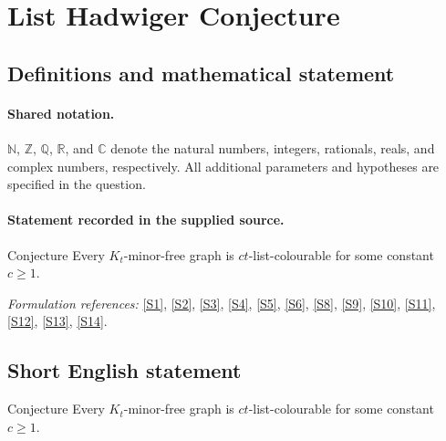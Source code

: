 \documentclass[11pt]{article}
\newcommand{\sref}[2]{\hyperlink{source:#1:#2}{[S#2]}}
\begin{document}
\section{List Hadwiger Conjecture}\label{statement}

\subsection{Definitions and mathematical statement}

\paragraph{Shared notation.}$\mathbb N$, $\mathbb Z$, $\mathbb Q$, $\mathbb R$, and $\mathbb C$ denote the natural numbers, integers, rationals, reals, and complex numbers, respectively. All additional parameters and hypotheses are specified in the question.


\paragraph{Statement recorded in the supplied source.}
Conjecture Every $K_t$-minor-free graph is $c t$-list-colourable for some constant $c\geq1$.
\par\smallskip\textit{Formulation references:} \sref{statement}{1}, \sref{statement}{2}, \sref{statement}{3}, \sref{statement}{4}, \sref{statement}{5}, \sref{statement}{6}, \sref{statement}{8}, \sref{statement}{9}, \sref{statement}{10}, \sref{statement}{11}, \sref{statement}{12}, \sref{statement}{13}, \sref{statement}{14}.
\subsection{Short English statement}
Conjecture Every $K_t$-minor-free graph is $c t$-list-colourable for some constant $c\geq1$.
\end{document}
